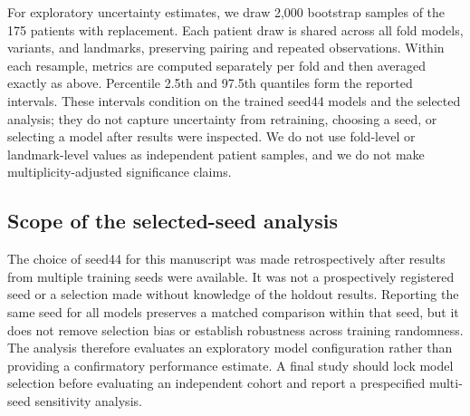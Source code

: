 For exploratory uncertainty estimates, we draw 2,000 bootstrap samples of the 175 patients with replacement. Each patient draw is shared across all fold models, variants, and landmarks, preserving pairing and repeated observations. Within each resample, metrics are computed separately per fold and then averaged exactly as above. Percentile 2.5th and 97.5th quantiles form the reported intervals. These intervals condition on the trained seed44 models and the selected analysis; they do not capture uncertainty from retraining, choosing a seed, or selecting a model after results were inspected. We do not use fold-level or landmark-level values as independent patient samples, and we do not make multiplicity-adjusted significance claims.

\subsection{Scope of the selected-seed analysis}
The choice of seed44 for this manuscript was made retrospectively after results from multiple training seeds were available. It was not a prospectively registered seed or a selection made without knowledge of the holdout results. Reporting the same seed for all models preserves a matched comparison within that seed, but it does not remove selection bias or establish robustness across training randomness. The analysis therefore evaluates an exploratory model configuration rather than providing a confirmatory performance estimate. A final study should lock model selection before evaluating an independent cohort and report a prespecified multi-seed sensitivity analysis.

